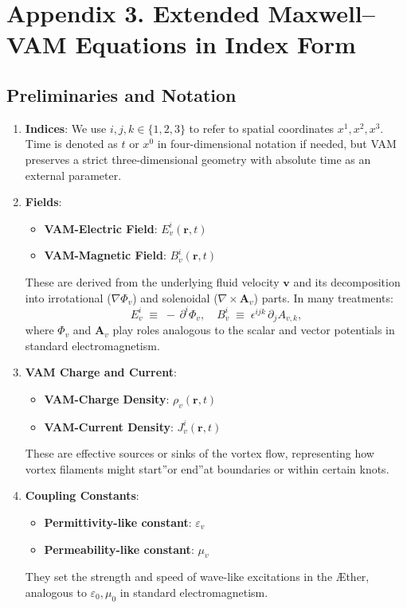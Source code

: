 
\section{Appendix 3. Extended Maxwell--VAM Equations in Index Form}

\subsection{Preliminaries and Notation}

\begin{enumerate}
    \item \textbf{Indices}: We use \(i, j, k \in \{1,2,3\}\) to refer to spatial coordinates \(x^1, x^2, x^3\). Time is denoted as \(t\) or \(x^0\) in four-dimensional notation if needed, but VAM preserves a strict three-dimensional geometry with absolute time as an external parameter.
    \item \textbf{Fields}:
    \begin{itemize}
        \item \textbf{VAM-Electric Field}: \(E_{v}^i(\mathbf{r}, t)\)
        \item \textbf{VAM-Magnetic Field}: \(B_{v}^i(\mathbf{r}, t)\)
    \end{itemize}
    These are derived from the underlying fluid velocity \(\mathbf{v}\) and its decomposition into irrotational (\(\nabla \Phi_v\)) and solenoidal (\(\nabla \times \mathbf{A}_v\)) parts. In many treatments:
    \[
        E_{v}^i \;\equiv\; -\,\partial^i \Phi_v,
        \quad
        B_{v}^i \;\equiv\; \epsilon^{ijk}\,\partial_j A_{v,k},
    \]
    where \(\Phi_v\) and \(\mathbf{A}_v\) play roles analogous to the scalar and vector potentials in standard electromagnetism.
    \item \textbf{VAM Charge and Current}:
    \begin{itemize}
        \item \textbf{VAM-Charge Density}: \(\rho_v(\mathbf{r}, t)\)
        \item \textbf{VAM-Current Density}: \(J_{v}^i(\mathbf{r}, t)\)
    \end{itemize}
    These are effective sources or sinks of the vortex flow, representing how vortex filaments might \grqq start\textquotedblright or \grqq end\textquotedblright at boundaries or within certain knots.
    \item \textbf{Coupling Constants}:
    \begin{itemize}
        \item \textbf{Permittivity-like constant}: \(\varepsilon_v\)
        \item \textbf{Permeability-like constant}: \(\mu_v\)
    \end{itemize}
    They set the strength and speed of wave-like excitations in the Æther, analogous to \(\varepsilon_0, \mu_0\) in standard electromagnetism.
\end{enumerate}


